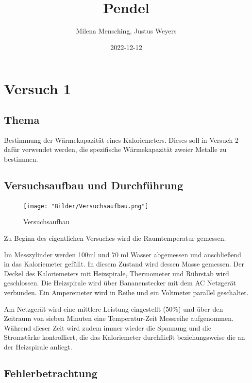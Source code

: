 \documentclass[
  9pt,
]{article}
\title{Pendel}
\author{Milena Mensching, Justus Weyers}
\date{2022-12-12}
\begin{document}
\maketitle

\hypertarget{versuch-1}{%
\section{Versuch 1}\label{versuch-1}}

\hypertarget{thema}{%
\subsection{Thema}\label{thema}}

Bestimmung der Wärmekapazität eines Kaloriemeters. Dieses soll in
Versuch 2 dafür verwendet werden, die spezifische Wärmekapazität zweier
Metalle zu bestimmen.

\hypertarget{versuchsaufbau-und-durchfuxfchrung}{%
\subsection{Versuchsaufbau und
Durchführung}\label{versuchsaufbau-und-durchfuxfchrung}}

\begin{figure}
\centering
\texttt{[image: "Bilder/Versuchsaufbau.png"]}
\caption{Versuchsaufbau}
\end{figure}

Zu Beginn des eigentlichen Versuches wird die Raumtemperatur gemessen.

Im Messzylinder werden 100ml und 70 ml Wasser abgemessen und
anschließend in das Kaloriemeter gefüllt. In diesem Zustand wird dessen
Masse gemessen. Der Deckel des Kaloriemeters mit Heizspirale,
Thermometer und Rührstab wird geschlossen. Die Heizspirale wird über
Bananenstecker mit dem AC Netzgerät verbunden. Ein Amperemeter wird in
Reihe und ein Voltmeter parallel geschaltet.

Am Netzgerät wird eine mittlere Leistung eingestellt (50\%) und über den
Zeitraum von sieben Minuten eine Temperatur-Zeit Messreihe aufgenommen.
Während dieser Zeit wird zudem immer wieder die Spannung und die
Stromstärke kontrolliert, die das Kaloriemeter durchfließt
beziehungsweise die an der Heizspirale anliegt.

\hypertarget{fehlerbetrachtung}{%
\subsection{Fehlerbetrachtung}\label{fehlerbetrachtung}}
\end{document}
